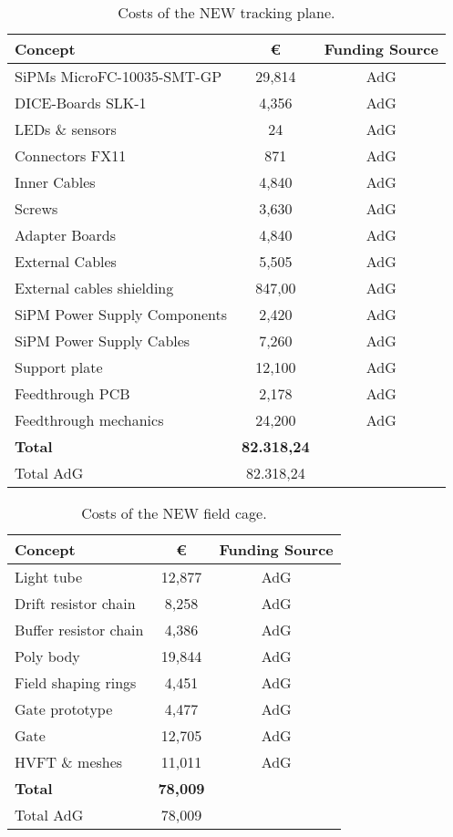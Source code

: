 \begin{table}[h!]
\begin{center}
\begin{tabular}{|l|c|c|}
\hline
 Concept & \euro & Funding Source \\
 \hline
SiPMs MicroFC-10035-SMT-GP &	29,814 & AdG \\
DICE-Boards SLK-1	&	4,356 & AdG \\
LEDs \& sensors	&	24 & AdG \\
Connectors FX11	&	871 & AdG \\
Inner Cables	&	4,840 & AdG \\
Screws	&	3,630 & AdG \\
Adapter Boards &	4,840 & AdG \\
External Cables &	5,505 & AdG \\
External cables shielding	&	847,00 & AdG \\
SiPM Power Supply Components	& 2,420 & AdG \\
SiPM Power Supply Cables	& 7,260 & AdG \\
Support plate  & 12,100 &  AdG \\
 Feedthrough PCB	&	2,178 & AdG \\
Feedthrough mechanics &	 24,200 & AdG \\
  \hline
{\bf Total}	&	{\bf 82.318,24 }	& \\
  Total AdG	&	82.318,24 	& \\
 \hline\hline
\end{tabular}  
\caption{Costs of the NEW tracking plane.}
\label{tab.new:TP}
\end{center}
\end{table} 

\begin{table}[h!]
\begin{center}
\begin{tabular}{|l|c|c|}
\hline
 Concept & \euro & Funding Source \\
 \hline
 Light tube & 12,877 & AdG \\
 Drift resistor chain & 8,258 & AdG \\
 Buffer resistor chain & 4,386 & AdG\\
 Poly body & 19,844 & AdG \\
 Field shaping rings & 4,451 & AdG \\
 Gate prototype & 4,477 & AdG \\
 Gate & 12,705 & AdG \\
 HVFT \& meshes & 11,011 & AdG \\
  \hline
{\bf Total} &	{\bf 78,009}	& \\
  Total AdG	&	78,009	& \\
 \hline\hline
\end{tabular}  
\caption{Costs of the NEW field cage.}
\label{tab.new:FC}
\end{center}
\end{table} 

